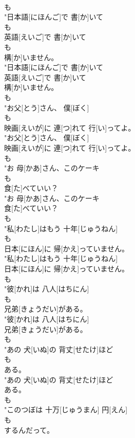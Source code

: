 \documentclass[8pt]{extreport}
\begin{document}
\begin{CJK}{UTF8}{min}
\\	も
\\	"日本語[にほんご]で 書[か]いて
\\	も
\\	英語[えいご]で 書[か]いて
\\	も
\\	構[か]いません。
\\	"日本語[にほんご]で 書[か]いて
\\	英語[えいご]で 書[か]いて
\\	構[か]いません。
\\	も
\\	"お父[とう]さん、 僕[ぼく]
\\	も
\\	映画[えいが]に 連[つ]れて 行[い]ってよ。
\\	"お父[とう]さん、 僕[ぼく]
\\	映画[えいが]に 連[つ]れて 行[い]ってよ。
\\	も
\\	"お 母[かあ]さん、このケーキ
\\	も
\\	食[た]べていい？
\\	"お 母[かあ]さん、このケーキ
\\	食[た]べていい？
\\	も
\\	"私[わたし]はもう 十年[じゅうねん]
\\	も
\\	日本[にほん]に 帰[かえ]っていません。
\\	"私[わたし]はもう 十年[じゅうねん]
\\	日本[にほん]に 帰[かえ]っていません。
\\	も
\\	"彼[かれ]は 八人[はちにん]
\\	も
\\	兄弟[きょうだい]がある。
\\	"彼[かれ]は 八人[はちにん]
\\	兄弟[きょうだい]がある。
\\	も
\\	"あの 犬[いぬ]の 背丈[せたけ]ほど
\\	も
\\	ある。
\\	"あの 犬[いぬ]の 背丈[せたけ]ほど
\\	ある。
\\	も
\\	"このつぼは 十万[じゅうまん] 円[えん]
\\	も
\\	するんだって。

\end{CJK}
\end{document}
